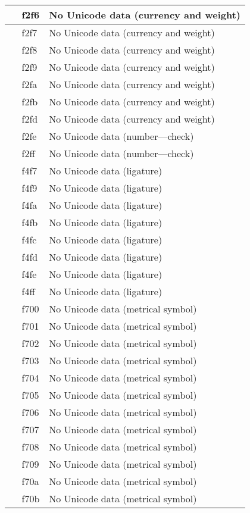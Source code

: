 \documentclass[12pt,letterpaper,openany]{book}
\begin{document}
\begin{center}
\begin{supertabular}{|m{0.25in}|m{0.5in}|m{4in}|}
 & f2f6 & No Unicode data (currency and weight)\\\hline
 & f2f7 & No Unicode data (currency and weight)\\\hline
 & f2f8 & No Unicode data (currency and weight)\\\hline
 & f2f9 & No Unicode data (currency and weight)\\\hline
 & f2fa & No Unicode data (currency and weight)\\\hline
 & f2fb & No Unicode data (currency and weight)\\\hline
 & f2fd & No Unicode data (currency and weight)\\\hline
 & f2fe & No Unicode data (number---check)\\\hline
 & f2ff & No Unicode data (number---check)\\\hline
 & f4f7 & No Unicode data (ligature)\\\hline
 & f4f9 & No Unicode data (ligature)\\\hline
 & f4fa & No Unicode data (ligature)\\\hline
 & f4fb & No Unicode data (ligature)\\\hline
 & f4fc & No Unicode data (ligature)\\\hline
 & f4fd & No Unicode data (ligature)\\\hline
 & f4fe & No Unicode data (ligature)\\\hline
 & f4ff & No Unicode data (ligature)\\\hline
 & f700 & No Unicode data (metrical symbol)\\\hline
 & f701 & No Unicode data (metrical symbol)\\\hline
 & f702 & No Unicode data (metrical symbol)\\\hline
 & f703 & No Unicode data (metrical symbol)\\\hline
 & f704 & No Unicode data (metrical symbol)\\\hline
 & f705 & No Unicode data (metrical symbol)\\\hline
 & f706 & No Unicode data (metrical symbol)\\\hline
 & f707 & No Unicode data (metrical symbol)\\\hline
 & f708 & No Unicode data (metrical symbol)\\\hline
 & f709 & No Unicode data (metrical symbol)\\\hline
 & f70a & No Unicode data (metrical symbol)\\\hline
 & f70b & No Unicode data (metrical symbol)\\\hline

\end{supertabular}
\end{center}
\end{document}
